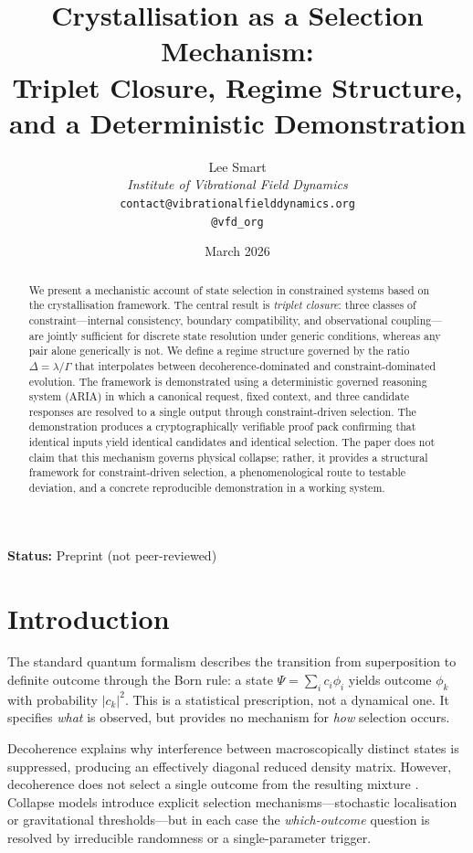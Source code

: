 \documentclass[12pt]{article}
\title{Crystallisation as a Selection Mechanism:\\Triplet Closure, Regime Structure, and a Deterministic Demonstration}
\author{%
  Lee Smart\\[4pt]
  \textit{Institute of Vibrational Field Dynamics}\\[2pt]
  \texttt{contact@vibrationalfielddynamics.org}\\[2pt]
  \texttt{@vfd\_org}%
}
\date{March 2026}
\begin{document}
\maketitle

\noindent\textbf{Status:} Preprint (not peer-reviewed)

\begin{abstract}
We present a mechanistic account of state selection in constrained systems based on the crystallisation framework. The central result is \textit{triplet closure}: three classes of constraint---internal consistency, boundary compatibility, and observational coupling---are jointly sufficient for discrete state resolution under generic conditions, whereas any pair alone generically is not. We define a regime structure governed by the ratio $\Delta = \lambda/\Gamma$ that interpolates between decoherence-dominated and constraint-dominated evolution. The framework is demonstrated using a deterministic governed reasoning system (ARIA) in which a canonical request, fixed context, and three candidate responses are resolved to a single output through constraint-driven selection. The demonstration produces a cryptographically verifiable proof pack confirming that identical inputs yield identical candidates and identical selection. The paper does not claim that this mechanism governs physical collapse; rather, it provides a structural framework for constraint-driven selection, a phenomenological route to testable deviation, and a concrete reproducible demonstration in a working system.
\end{abstract}

\section{Introduction}

The standard quantum formalism describes the transition from superposition to definite outcome through the Born rule: a state $\Psi = \sum_i c_i \phi_i$ yields outcome $\phi_k$ with probability $|c_k|^2$. This is a statistical prescription, not a dynamical one. It specifies \textit{what} is observed, but provides no mechanism for \textit{how} selection occurs.

Decoherence \citep{Zurek2003, Schlosshauer2007} explains why interference between macroscopically distinct states is suppressed, producing an effectively diagonal reduced density matrix. However, decoherence does not select a single outcome from the resulting mixture \citep{Schlosshauer2005}. Collapse models \citep{GRW1986, Penrose1996} introduce explicit selection mechanisms---stochastic localisation or gravitational thresholds---but in each case the \textit{which-outcome} question is resolved by irreducible randomness or a single-parameter trigger.
\end{document}
